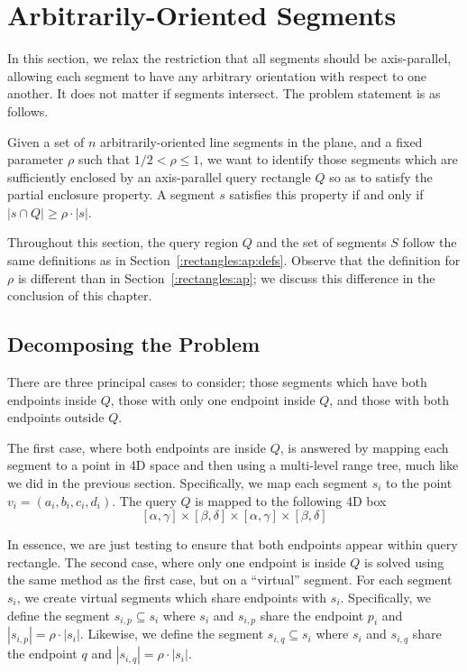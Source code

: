 \section{Arbitrarily-Oriented Segments}
\label{:rectangles:ao}

In this section, we relax the restriction that all segments should be axis-parallel, allowing each segment to have any arbitrary orientation with respect to one another. 
It does not matter if segments intersect. 
The problem statement is as follows.

\begin{problem}
Given a set of $n$ arbitrarily-oriented line segments in the plane, and a fixed parameter $\rho$ such that $1/2 < \rho \leq 1$, we want to identify those segments which are sufficiently enclosed by an axis-parallel query rectangle $Q$ so as to satisfy the partial enclosure property. 
A segment $s$ satisfies this property if and only if $|s \cap Q| \geq \rho \cdot |s|$.
\end{problem}

Throughout this section, the query region $Q$ and the set of segments $S$ follow the same definitions as in Section~\ref{:rectangles:ap:defs}. 
Observe that the definition for $\rho$ is different than in Section~\ref{:rectangles:ap}; we discuss this difference in the conclusion of this chapter.


\subsection{Decomposing the Problem}
\label{:rectangles:ao:approach}

There are three principal cases to consider; those segments which have both endpoints inside $Q$, those with only one endpoint inside $Q$, and those with both endpoints outside $Q$.  

The first case, where both endpoints are inside $Q$, is answered by mapping each segment to a point in 4D space and then using a multi-level range tree, much like we did in the previous section.  Specifically, we map each segment $s_i$ to the point $v_i = (a_i, b_i, c_i, d_i)$. The query $Q$ is mapped to the following 4D box
\[
[\alpha, \gamma] \times [\beta, \delta] \times [\alpha, \gamma] \times [\beta, \delta]
\]

In essence, we are just testing to ensure that both endpoints appear within query rectangle.
The second case, where only one endpoint is inside $Q$ is solved using the same method as the first case, but on a ``virtual'' segment.
For each segment $s_i$, we create virtual segments which share endpoints with $s_i$.
Specifically, we define the segment $s_{i,p} \subseteq s_i$ where $s_i$ and $s_{i,p}$ share the endpoint $p_i$ and $|s_{i,p}| = \rho \cdot |s_i|$.
Likewise, we define the segment $s_{i,q} \subseteq s_i$ where $s_i$ and $s_{i,q}$ share the endpoint $q$ and $|s_{i,q}| = \rho \cdot |s_i|$.

